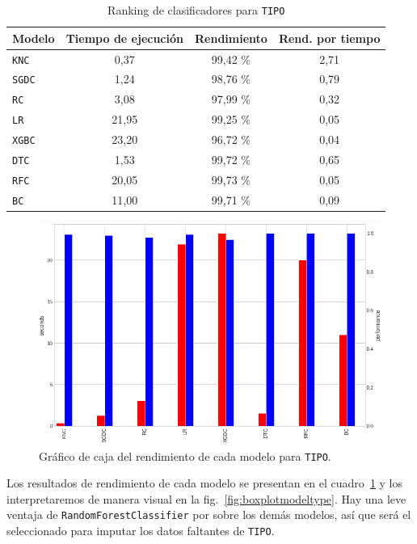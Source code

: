\documentclass[a4paper,12pt]{article}
\begin{document}
\begin{table}[H]
\centering
\begin{tabular}{lccc}
\textbf{Modelo} & \textbf{Tiempo de ejecución} & \textbf{Rendimiento} & \textbf{Rend. por tiempo} \\ \hline
\texttt{KNC}  & 0,37  & 99,42 \% & 2,71 \\
\texttt{SGDC} & 1,24  & 98,76 \% & 0,79 \\
\texttt{RC}   & 3,08  & 97,99 \% & 0,32 \\
\texttt{LR}   & 21,95 & 99,25 \% & 0,05 \\
\texttt{XGBC} & 23,20 & 96,72 \% & 0,04 \\
\texttt{DTC}  & 1,53  & 99,72 \% & 0,65 \\
\texttt{RFC}  & 20,05 & 99,73 \% & 0,05 \\
\texttt{BC}   & 11,00 & 99,71 \% & 0,09
\end{tabular}
\caption{Ranking de clasificadores para \texttt{TIPO}}
\label{tab:classifiers-table}
\end{table}

\begin{figure}[H]
	\begin{center}
	\includegraphics[width=1\textwidth]{tipotimes.png}
  	\caption{Gráfico de caja del rendimiento de cada modelo para \texttt{TIPO}.}
  	\label{fig:modeltxtipo}
  	\end{center}
\end{figure}

Los resultados de rendimiento de cada modelo se presentan en el cuadro~\ref{tab:classifiers-table} y los interpretaremos de manera visual en la fig.~\ref{fig:boxplotmodeltype}. Hay una leve ventaja de \texttt{RandomForestClassifier} por sobre los demás modelos, así que será el seleccionado para imputar los datos faltantes de \texttt{TIPO}.
\end{document}
